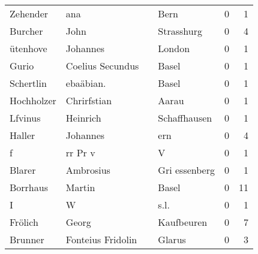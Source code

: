 \begin{tabular}{llllrr}
                 Zehender &                                ana &             &                                        Bern &          0 &         1 \\
                  Burcher &                               John &             &                                  Strasshurg &          0 &         4 \\
                 ütenhove &                           Johannes &             &                                      London &          0 &         1 \\
                    Gurio &                   Coelius Secundus &             &                                       Basel &          0 &         1 \\
                Schertlin &                          ebaäbian. &             &                                       Basel &          0 &         1 \\
               Hochholzer &                        Chrirfstian &             &                                       Aarau &          0 &         1 \\
                  Lfvinus &                           Heinrich &             &                                Schaffhausen &          0 &         1 \\
                   Haller &                           Johannes &             &                                         ern &          0 &         4 \\
                        f &                            rr Pr v &             &                                           V &          0 &         1 \\
                   Blarer &                          Ambrosius &             &                               Gri essenberg &          0 &         1 \\
                 Borrhaus &                             Martin &             &                                       Basel &          0 &        11 \\
                        I &                                  W &             &                                        s.l. &          0 &         1 \\
                  Frölich &                              Georg &             &                                  Kaufbeuren &          0 &         7 \\
                  Brunner &                  Fonteius Fridolin &             &                                      Glarus &          0 &         3 \\

\end{tabular}
